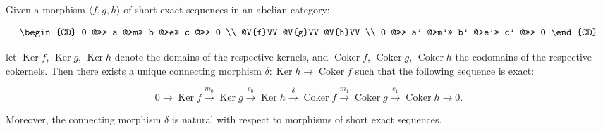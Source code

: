 Given a morphism $\langle f, g, h \rangle$ of short exact sequences in an abelian category:

\[
\begin{CD}
0 @>>> a @>m>> b @>e>> c @>>> 0 \\
@V{f}VV @V{g}VV @V{h}VV \\
0 @>>> a' @>m'>> b' @>e'>> c' @>>> 0
\end{CD}
\]

let $\operatorname{Ker} f$, $\operatorname{Ker} g$, $\operatorname{Ker} h$ denote the domains of the respective kernels, and $\operatorname{Coker} f$, $\operatorname{Coker} g$, $\operatorname{Coker} h$ the codomains of the respective cokernels. Then there exists a unique connecting morphism $\delta : \operatorname{Ker} h \rightarrow \operatorname{Coker} f$ such that the following sequence is exact:

\[
0 \rightarrow \operatorname{Ker} f \xrightarrow{m_0} \operatorname{Ker} g \xrightarrow{e_0} \operatorname{Ker} h \xrightarrow{\delta} \operatorname{Coker} f \xrightarrow{m_1} \operatorname{Coker} g \xrightarrow{e_1} \operatorname{Coker} h \rightarrow 0.
\]

Moreover, the connecting morphism $\delta$ is natural with respect to morphisms of short exact sequences.
